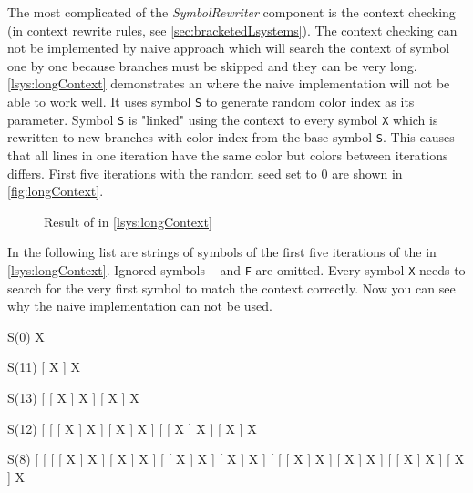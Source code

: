 The most complicated of the \emph{SymbolRewriter} component is the context checking (in context rewrite rules, see \autoref{sec:bracketedLsystems}).
The context checking can not be implemented by naive approach which will search the context of symbol one by one because branches must be skipped and they can be very long.
\autoref{lsys:longContext} demonstrates an \lsystem where the naive implementation will not be able to work well.
It uses symbol \texttt{S} to generate random color index as its parameter.
Symbol \texttt{S} is "linked" using the context to every symbol \texttt{X} which is rewritten to new branches with color index from the base symbol \texttt{S}.
This causes that all lines in one iteration have the same color but colors between iterations differs.
First five iterations with the random seed set to 0 are shown in \autoref{fig:longContext}.


\begin{figure}[h]
	 \hfill
	 \hfill
	 \hfill
	 \hfill
	\caption{Result of \lsystem in \autoref{lsys:longContext}}
	\label{fig:longContext}
\end{figure}


In the following list are strings of symbols of the first five iterations of the \lsystem in \autoref{lsys:longContext}.
Ignored symbols \texttt{-} and \texttt{F} are omitted.
Every symbol \texttt{X} needs to search for the very first symbol to match the context correctly.
Now you can see why the naive implementation can not be used.

\begin{enumerate*}
	\item S(0) X
	\item S(11) [ X ] X
	\item S(13) [ [ X ] X ] [ X ] X
	\item S(12) [ [ [ X ] X ] [ X ] X ] [ [ X ] X ] [ X ] X 
	\item S(8) [ [ [ [ X ] X ] [ X ] X ] [ [ X ] X ] [ X ] X ] [ [ [ X ] X ] [ X ] X ] [ [ X ] X ] [ X ] X 
\end{enumerate*}

